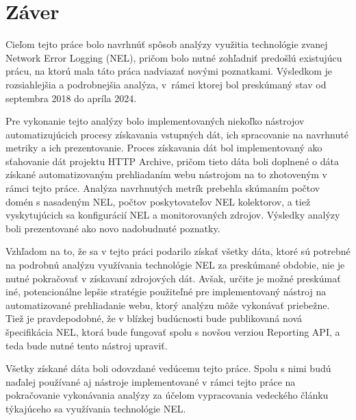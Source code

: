 \chapter{Záver}
\label{zaver}

Cieľom tejto práce bolo navrhnúť spôsob analýzy využitia technológie zvanej Network Error Logging (NEL), pričom bolo nutné zohľadniť predošlú existujúcu prácu, na ktorú mala táto práca nadviazať novými poznatkami.
Výsledkom je rozsiahlejšia a podrobnejšia analýza, \mbox{v rámci} ktorej bol preskúmaný stav od septembra 2018 do apríla 2024.

Pre vykonanie tejto analýzy bolo implementovaných niekoľko nástrojov automatizujúcich procesy získavania vstupných dát, ich spracovanie na navrhnuté metriky a ich prezentovanie.
Proces získavania dát bol implementovaný ako sťahovanie dát projektu HTTP Archive, pričom tieto dáta boli doplnené o dáta získané automatizovaným prehliadaním webu nástrojom na to zhotoveným v rámci tejto práce. 
Analýza navrhnutých metrík prebehla skúmaním počtov domén s nasadeným NEL, počtov poskytovateľov NEL kolektorov, a tiež vyskytujúcich sa konfigurácií NEL a monitorovaných zdrojov.
Výsledky analýzy boli prezentované ako novo nadobudnuté poznatky.

Vzhľadom na to, že sa v tejto práci podarilo získať všetky dáta, ktoré sú potrebné na podrobnú analýzu využívania technológie NEL za preskúmané obdobie, nie je nutné pokračovať v získavaní zdrojových dát.
Avšak, určite je možné preskúmať iné, potencionálne lepšie stratégie použiteľné pre implementovaný nástroj na automatizované prehliadanie webu, ktorý analýzu môže vykonávať priebežne.
Tiež je pravdepodobné, že v blízkej budúcnosti bude publikovaná nová špecifikácia NEL, ktorá bude fungovať spolu s novšou verziou Reporting API, a teda bude nutné tento nástroj upraviť.

Všetky získané dáta boli odovzdané vedúcemu tejto práce.
Spolu s nimi budú naďalej používané aj nástroje implementované v rámci tejto práce na pokračovanie vykonávania analýzy za účelom vypracovania vedeckého článku týkajúceho sa využívania technológie NEL. 
